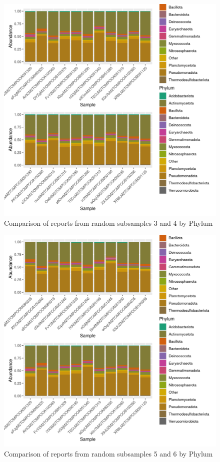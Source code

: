 \documentclass{article}
\begin{document}
\begin{figure}
\centering
\includegraphics[scale=0.8]{tomate_aleatorio1_3.csv_tomate_aleatorio1_4.csv_relative_abundance_Phylum.png}
\caption{Comparison of reports from random subsamples 3 and 4 by Phylum}
\end{figure}


\begin{figure}
\centering
\includegraphics[scale=0.8]{tomate_aleatorio1_5.csv_tomate_aleatorio1_6.csv_relative_abundance_Phylum.png}
\caption{Comparison of reports from random subsamples 5 and 6 by Phylum}
\end{figure}
\end{document}
